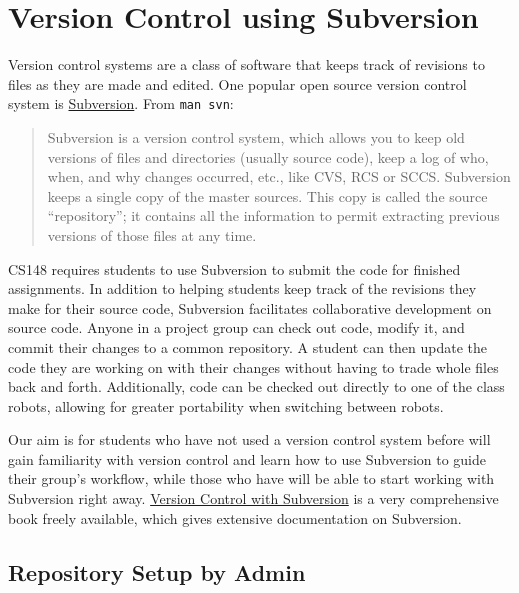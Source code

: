 \section{Version Control using Subversion}

Version control systems are a class of software that keeps track of revisions to files as they are made and edited. One popular open source version control system is \href{http://subversion.tigris.org/}{Subversion}. From \texttt{man svn}:

\begin{quote}
Subversion is a version control system, which allows you to keep old versions of files and directories (usually source code), keep a log of who, when, and why changes occurred, etc., like CVS, RCS or SCCS. Subversion keeps a single copy of the master sources. This copy is called the source ``repository''; it contains all the information to permit extracting previous versions of those files at any time.
\end{quote}

CS148 requires students to use Subversion to submit the code for finished assignments. In addition to helping students keep track of the revisions they make for their source code, Subversion facilitates collaborative development on source code. Anyone in a project group can check out code, modify it, and commit their changes to a common repository. A student can then update the code they are working on with their changes without having to trade whole files back and forth. Additionally, code can be checked out directly to one of the class robots, allowing for greater portability when switching between robots.

Our aim is for students who have not used a version control system before will gain familiarity with version control and learn how to use Subversion to guide their group's workflow, while those who have will be able to start working with Subversion right away. \href{http://svnbook.red-bean.com/}{Version Control with Subversion} is a very comprehensive book freely available, which gives extensive documentation on Subversion.

\subsection{Repository Setup by Admin}

